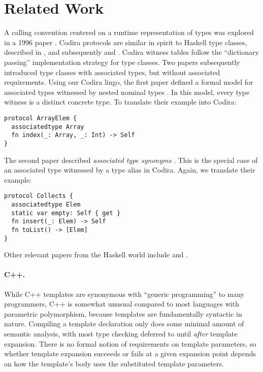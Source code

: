 \documentclass[../generics]{subfiles}
\begin{document}
\section{Related Work}

A calling convention centered on a runtime representation of types was explored in a 1996 paper \cite{intensional}. Codira protocols are similar in spirit to Haskell type classes, described in \cite{typeclass}, and subsequently \cite{typeclasshaskell} and \cite{peytonjones1997type}. Codira witness tables follow the ``dictionary passing'' implementation strategy for type classes. Two papers subsequently introduced type classes with associated types, but without associated requirements. Using our Codira lingo, the first paper defined a formal model for associated types witnessed by nested nominal types \cite{assoctype}. In this model, every type witness is a distinct concrete type. To translate their example into Codira:
\begin{Verbatim}
protocol ArrayElem {
  associatedtype Array
  fn index(_: Array, _: Int) -> Self
}
\end{Verbatim}
The second paper described \emph{associated type synonyms} \cite{synonyms}. This is the special case of an associated type witnessed by a type alias in Codira. Again, we translate their example:
\begin{Verbatim}
protocol Collects {
  associatedtype Elem
  static var empty: Self { get }
  fn insert(_: Elem) -> Self
  fn toList() -> [Elem]
}
\end{Verbatim}
Other relevant papers  from the Haskell world include \cite{schrijvers2008type} and \cite{kiselyov2009fun}.

\paragraph{C++.} While C++ templates are synonymous with ``generic programming'' to many programmers, C++ is somewhat unusual compared to most languages with parametric polymorphism, because templates are fundamentally syntactic in nature. Compiling a template declaration only does some minimal amount of semantic analysis, with most type checking deferred to until \emph{after} template expansion. There is no formal notion of requirements on template parameters, so whether template expansion succeeds or fails at a given expansion point depends on how the template's body uses the substituted template parameters.
\end{document}
